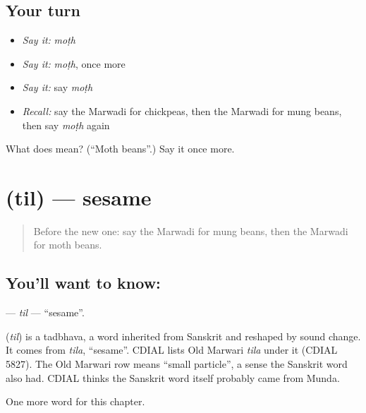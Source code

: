 \subsection*{Your turn}
\begin{itemize}
\raggedright
  \item \emph{Say it:} \emph{moṭh}
  \item \emph{Say it:} \emph{moṭh}, once more
  \item \emph{Say it:} say \emph{moṭh}
  \item \emph{Recall:} say the Marwadi for chickpeas, then the Marwadi for mung beans, then say \emph{moṭh} again
\end{itemize}

\begin{tcolorbox}[breakable,colback=teal!4,colframe=teal!35!black,title={Before you move on}]
What does  mean? (\textquotedblleft{}Moth beans\textquotedblright{}.) Say it once more.
\end{tcolorbox}
\section[\texorpdfstring{\mw{तिल} (til)}{तिल (til)}]{ (til) — sesame}

\label{lesson:MW-C133-til}



\begin{quote}
Before the new one: say the Marwadi for mung beans, then the Marwadi for moth beans.
\end{quote}

\subsection*{You'll want to know: }
\textbf{} — \emph{til} — \textquotedblleft{}sesame\textquotedblright{}.

\begin{cousinweb}
\textbf{} (\emph{til}) is a tadbhava, a word inherited from Sanskrit and reshaped by sound change. It comes from \emph{tila}, \textquotedblleft{}sesame\textquotedblright{}. CDIAL lists Old Marwari \emph{tila} under it (CDIAL 5827). The Old Marwari row means \textquotedblleft{}small particle\textquotedblright{}, a sense the Sanskrit word also had. CDIAL thinks the Sanskrit word itself probably came from Munda.
\end{cousinweb}

\begin{grammarlens}[title={What you've built}]
One more word for this chapter.
\end{grammarlens}

